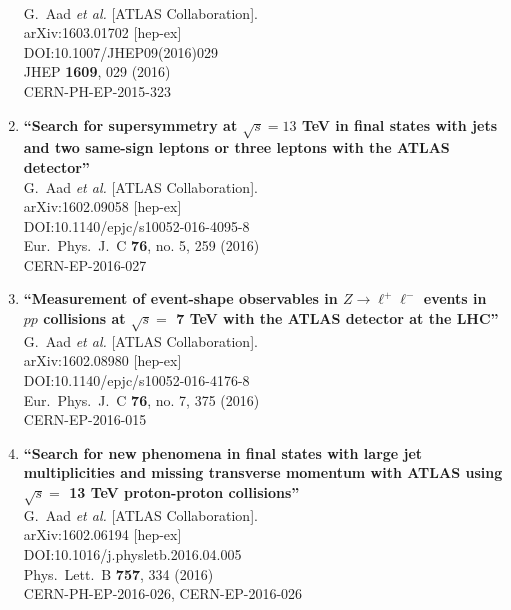 \documentclass{article}
\begin{document}
\begin{enumerate}
  \\{}G.~Aad {\it et al.} [ATLAS Collaboration].
  \\{}arXiv:1603.01702 [hep-ex]
  \\{}DOI:10.1007/JHEP09(2016)029
  \\{}JHEP {\bf 1609}, 029 (2016)
  \\{}CERN-PH-EP-2015-323
\item%
{\bf ``Search for supersymmetry at $\sqrt{s}=13$  TeV in final states with jets and two same-sign leptons or three leptons with the ATLAS detector''}
  \\{}G.~Aad {\it et al.} [ATLAS Collaboration].
  \\{}arXiv:1602.09058 [hep-ex]
  \\{}DOI:10.1140/epjc/s10052-016-4095-8
  \\{}Eur.\ Phys.\ J.\ C {\bf 76}, no. 5, 259 (2016)
  \\{}CERN-EP-2016-027
\item%
{\bf ``Measurement of event-shape observables in $Z \rightarrow \ell ^{+} \ell ^{-}$ events in $pp$ collisions at $\sqrt{s}=$ 7 TeV with the ATLAS detector at the LHC''}
  \\{}G.~Aad {\it et al.} [ATLAS Collaboration].
  \\{}arXiv:1602.08980 [hep-ex]
  \\{}DOI:10.1140/epjc/s10052-016-4176-8
  \\{}Eur.\ Phys.\ J.\ C {\bf 76}, no. 7, 375 (2016)
  \\{}CERN-EP-2016-015
\item%
{\bf ``Search for new phenomena in final states with large jet multiplicities and missing transverse momentum with ATLAS using $\sqrt{s} =$ 13 TeV proton-proton collisions''}
  \\{}G.~Aad {\it et al.} [ATLAS Collaboration].
  \\{}arXiv:1602.06194 [hep-ex]
  \\{}DOI:10.1016/j.physletb.2016.04.005
  \\{}Phys.\ Lett.\ B {\bf 757}, 334 (2016)
  \\{}CERN-PH-EP-2016-026, CERN-EP-2016-026

\end{enumerate}
\end{document}
